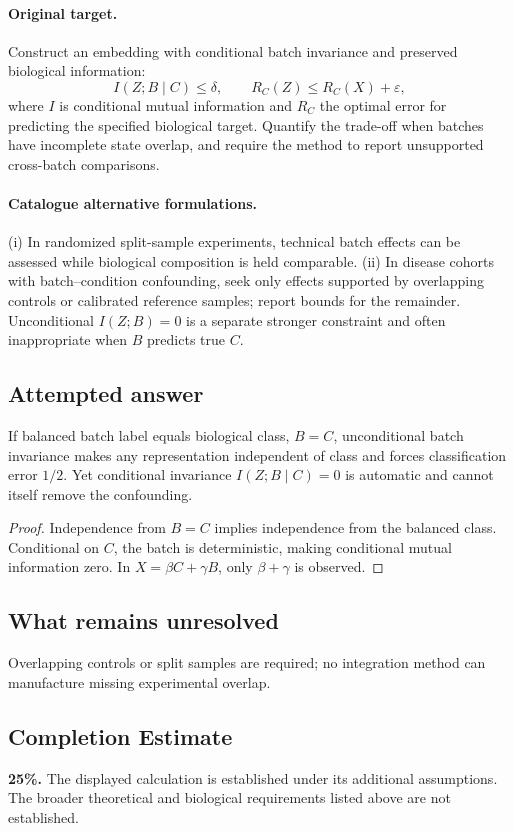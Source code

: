 \documentclass[11pt]{article}
\begin{document}
\paragraph{Original target.}
Construct an embedding with conditional batch invariance and preserved biological information:
\[I(Z;B\mid C)\le\delta,\qquad R_C(Z)\le R_C(X)+\varepsilon,\]
where $I$ is conditional mutual information and $R_C$ the optimal error for predicting the specified biological target. Quantify the trade-off when batches have incomplete state overlap, and require the method to report unsupported cross-batch comparisons.
\paragraph{Catalogue alternative formulations.}
(i) In randomized split-sample experiments, technical batch effects can be assessed while biological composition is held comparable. (ii) In disease cohorts with batch--condition confounding, seek only effects supported by overlapping controls or calibrated reference samples; report bounds for the remainder. Unconditional $I(Z;B)=0$ is a separate stronger constraint and often inappropriate when $B$ predicts true $C$.
\subsection{Attempted answer}
\begin{proposition}
If balanced batch label equals biological class, $B=C$, unconditional batch invariance makes any representation independent of class and forces classification error $1/2$. Yet conditional invariance $I(Z;B\mid C)=0$ is automatic and cannot itself remove the confounding.
\end{proposition}
\begin{proof}
Independence from $B=C$ implies independence from the balanced class. Conditional on $C$, the batch is deterministic, making conditional mutual information zero. In $X=\beta C+\gamma B$, only $\beta+\gamma$ is observed.
\end{proof}
\subsection{What remains unresolved}
Overlapping controls or split samples are required; no integration method can manufacture missing experimental overlap.
\subsection{Completion Estimate}
\textbf{25\%.} The displayed calculation is established under its additional assumptions. The broader theoretical and biological requirements listed above are not established.
\end{document}
